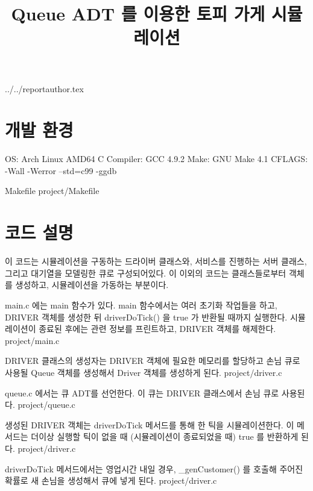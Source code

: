 \documentclass {article}
\begin{document}
\title {Queue ADT 를 이용한 토피 가게 시뮬레이션}
 {../../reportauthor.tex}
\maketitle

\section {개발 환경}
{\setlength{\parindent}{0cm}
OS: Arch Linux AMD64\newline
C Compiler: GCC 4.9.2\newline
Make: GNU Make 4.1\newline
CFLAGS: -Wall -Werror --std=c99 -ggdb

{\setlength{\parindent}{0cm}
Makefile
{project/Makefile}
\vspace{\baselineskip}

\section {코드 설명}
이 코드는 시뮬레이션을 구동하는 드라이버 클래스와, 서비스를 진행하는 서버 클래스, 그리고 대기열을 모델링한 큐로 구성되어있다. 이 이외의 코드는 클래스들로부터 객체를 생성하고, 시뮬레이션을 가동하는 부분이다.

main.c 에는 main 함수가 있다. main 함수에서는 여러 초기화 작업들을 하고, DRIVER 객체를 생성한 뒤 driverDoTick() 을 true 가 반환될 때까지 실행한다. 시뮬레이션이 종료된 후에는 관련 정보를 프린트하고, DRIVER 객체를 해제한다. 
{project/main.c}

DRIVER 클래스의 생성자는 DRIVER 객체에 필요한 메모리를 할당하고 손님 큐로 사용될 Queue 객체를 생성해서 Driver 객체를 생성하게 된다.
{project/driver.c}

queue.c 에서는 큐 ADT를 선언한다. 이 큐는 DRIVER 클래스에서 손님 큐로 사용된다.
{project/queue.c}

생성된 DRIVER 객체는 driverDoTick 메서드를 통해 한 틱을 시뮬레이션한다. 이 메서드는 더이상 실행할 틱이 없을 때 (시뮬레이션이 종료되었을 때) true 를 반환하게 된다.
{project/driver.c}

driverDoTick 메서드에서는 영업시간 내일 경우, \_genCustomer() 를 호출해 주어진 확률로 새 손님을 생성해서 큐에 넣게 된다. 
{project/driver.c}

}}
\end{document}

